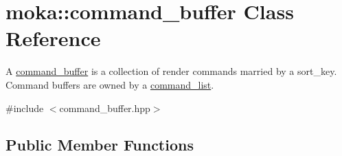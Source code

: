\hypertarget{classmoka_1_1command__buffer}{}\section{moka\+::command\+\_\+buffer Class Reference}
\label{classmoka_1_1command__buffer}


A \mbox{\hyperlink{classmoka_1_1command__buffer}{command\+\_\+buffer}} is a collection of render commands married by a sort\+\_\+key. Command buffers are owned by a \mbox{\hyperlink{classmoka_1_1command__list}{command\+\_\+list}}.  




{\ttfamily \#include $<$command\+\_\+buffer.\+hpp$>$}

\subsection*{Public Member Functions}
